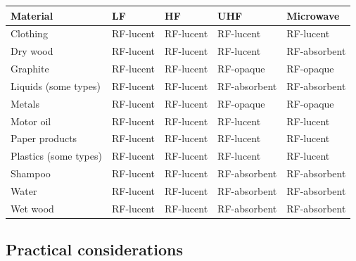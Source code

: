 \begin{table}[]
    \begin{tabular}{|l|l|l|l|l|}
    \hline
    \textbf{Material}     & \textbf{LF} & \textbf{HF} & \textbf{UHF} & \textbf{Microwave} \\ \hline
    Clothing              & RF-lucent   & RF-lucent   & RF-lucent    & RF-lucent          \\ \hline
    Dry wood              & RF-lucent   & RF-lucent   & RF-lucent    & RF-absorbent       \\ \hline
    Graphite              & RF-lucent   & RF-lucent   & RF-opaque    & RF-opaque          \\ \hline
    Liquids (some types)  & RF-lucent   & RF-lucent   & RF-absorbent & RF-absorbent       \\ \hline
    Metals                & RF-lucent   & RF-lucent   & RF-opaque    & RF-opaque          \\ \hline
    Motor oil             & RF-lucent   & RF-lucent   & RF-lucent    & RF-lucent          \\ \hline
    Paper products        & RF-lucent   & RF-lucent   & RF-lucent    & RF-lucent          \\ \hline
    Plastics (some types) & RF-lucent   & RF-lucent   & RF-lucent    & RF-lucent          \\ \hline
    Shampoo               & RF-lucent   & RF-lucent   & RF-absorbent & RF-absorbent       \\ \hline
    Water                 & RF-lucent   & RF-lucent   & RF-absorbent & RF-absorbent       \\ \hline
    Wet wood              & RF-lucent   & RF-lucent   & RF-absorbent & RF-absorbent       \\ \hline
    \end{tabular}
\end{table}

\subsection{Practical considerations}




